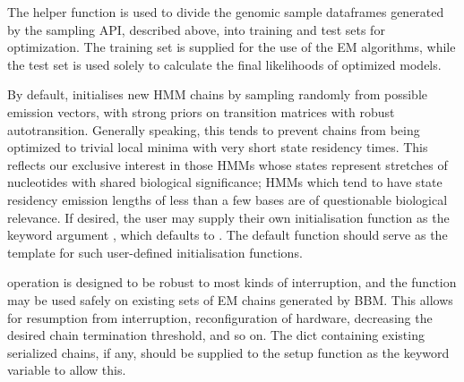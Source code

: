 The helper function  is used to divide the genomic sample dataframes generated by the sampling API, described above, into training and test sets for optimization. The training set is supplied for the use of the EM algorithms, while the test set is used solely to calculate the final likelihoods of optimized models.

By default,  initialises new HMM chains by sampling randomly from possible emission vectors, with strong priors on transition matrices with robust autotransition. Generally speaking, this tends to prevent chains from being optimized to trivial local minima with very short state residency times. This reflects our exclusive interest in those HMMs whose states represent stretches of nucleotides with shared biological significance; HMMs which tend to have state residency emission lengths of less than a few bases are of questionable biological relevance. If desired, the user may supply their own initialisation function as the  keyword argument , which defaults to . The default function should serve as the template for such user-defined initialisation functions.

 operation is designed to be robust to most kinds of interruption, and the  function may be used safely on existing sets of EM chains generated by BBM. This allows for resumption from interruption, reconfiguration of hardware, decreasing the desired chain termination threshold, and so on. The dict containing existing serialized chains, if any, should be supplied to the setup function as the  keyword variable to allow this.

